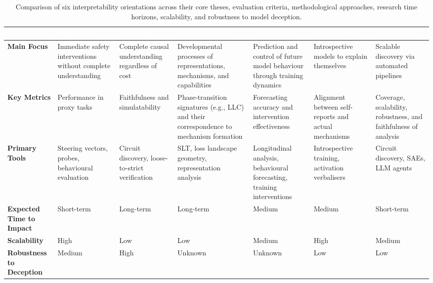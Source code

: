\begin{table}[tb]
\centering
\caption{Comparison of six interpretability orientations across their core theses, evaluation criteria, methodological approaches, research time horizons, scalability, and robustness to model deception.}
\label{tab:orientations}
\renewcommand{\arraystretch}{1.3}
\small
\begin{tabular}{>{\raggedright\arraybackslash}p{2.0cm}
                >{\raggedright\arraybackslash}p{1.9cm}
                >{\raggedright\arraybackslash}p{1.9cm}
                >{\raggedright\arraybackslash}p{1.9cm}
                >{\raggedright\arraybackslash}p{1.9cm}
                >{\raggedright\arraybackslash}p{1.9cm}
                >{\raggedright\arraybackslash}p{1.6cm}}
\toprule
\rowcolor{tableheader!80}
\textcolor{white}{\textbf{Dimension}} &
\textcolor{white}{\textbf{Pragmatic}} &
\textcolor{white}{\textbf{Ambitious}} &
\textcolor{white}{\textbf{Developmental}} &
\textcolor{white}{\textbf{Across Time}} &
\textcolor{white}{\textbf{Introspective}} &
\textcolor{white}{\textbf{Automated}} \\
\midrule

\rowcolor{tablerow1}
\textbf{Main Focus}
&
Immediate safety interventions without complete understanding
&
Complete causal understanding regardless of cost
&
Developmental processes of representations, mechanisms, and capabilities
&
Prediction and control of future model behaviour through training dynamics
&
Introspective models to explain themselves
&
Scalable discovery via automated pipelines
\\

\rowcolor{tablerow2}
\textbf{Key Metrics}
&
Performance in proxy tasks
&
Faithfulness and simulatability
&
Phase-transition signatures (e.g., LLC) and their correspondence to mechanism formation
&
Forecasting accuracy and intervention effectiveness
&
Alignment between self-reports and actual mechanisms
&
Coverage, scalability, robustness, and faithfulness of analysis
\\

\rowcolor{tablerow1}
\textbf{Primary Tools}
&
Steering vectors, probes, behavioural evaluation
&
Circuit discovery, loose-to-strict verification
&
SLT, loss landscape geometry, representation analysis
&
Longitudinal analysis, behavioural forecasting, training interventions
&
Introspective training, activation verbalisers
&
Circuit discovery, SAEs, LLM agents
\\

\rowcolor{tablerow2}
\textbf{Expected Time to Impact}
&
Short-term
&
Long-term
&
Long-term
&
Medium
&
Medium
&
Short-term
\\

\rowcolor{tablerow1}
\textbf{Scalability}
&
High
&
Low
&
Low
&
Medium
&
High
&
Medium
\\

\rowcolor{tablerow2}
\textbf{Robustness to Deception}
&
Medium
&
High
&
Unknown
&
Unknown
&
Low
&
Low
\\

\bottomrule
\end{tabular}
\end{table}

